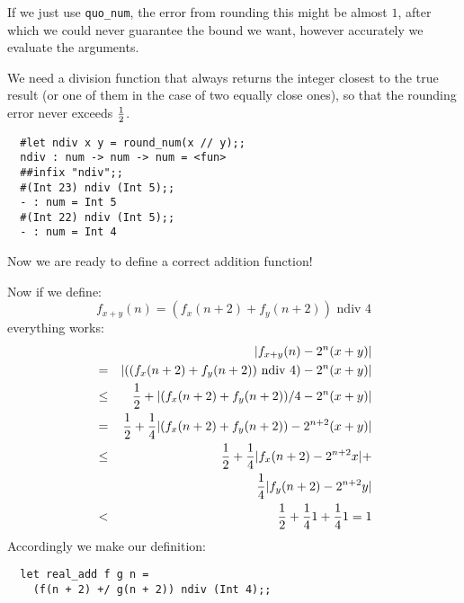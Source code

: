 \begin{slide*}


\vspace*{0.5cm}

If we just use {\black \tt quo\_num}, the error from rounding this might be almost
{\red $1$}, after which we could never guarantee the bound we want, however accurately
we evaluate the arguments.

We need a division function that always returns the integer closest to the true
result (or one of them in the case of two equally close ones), so that the
rounding error never exceeds {\red $1 \over 2$}.

\begin{black}\begin{verbatim}
  #let ndiv x y = round_num(x // y);;
  ndiv : num -> num -> num = <fun>
  ##infix "ndiv";;
  #(Int 23) ndiv (Int 5);;
  - : num = Int 5
  #(Int 22) ndiv (Int 5);;
  - : num = Int 4
\end{verbatim}\end{black}

Now we are ready to define a correct addition function!

\end{slide*}


\begin{slide*}


\vspace*{0.5cm}

Now if we define:
{\red $$ f_{x + y}(n) = (f_x(n + 2) + f_y(n + 2)) \mbox{ ndiv } 4 $$}
\noindent everything works:
{\red \begin{eqnarray*}
&      & |f_{x + y}(n) - 2^n (x + y)|                                   \\
& =    & |((f_x(n + 2) + f_y(n + 2)) \mbox{ ndiv } 4) - 2^n (x + y)|    \\
& \leq & {1 \over 2} + |(f_x(n + 2) + f_y(n + 2)) / 4 - 2^n (x + y)|    \\
& =    & {1 \over 2} + {1 \over 4} |(f_x(n + 2) + f_y(n + 2)) -
                                     2^{n + 2}(x + y)|                  \\
& \leq & {1 \over 2} + {1 \over 4} |f_x(n + 2) - 2^{n + 2} x| +         \\
&      &               {1 \over 4} |f_y(n + 2) - 2^{n + 2} y|           \\
& <    & {1 \over 2} + {1 \over 4} 1 + {1 \over 4} 1 = 1
\end{eqnarray*}}
\noindent Accordingly we make our definition:
\begin{black}\begin{verbatim}
  let real_add f g n =
    (f(n + 2) +/ g(n + 2)) ndiv (Int 4);;
\end{verbatim}\end{black}

\end{slide*}




